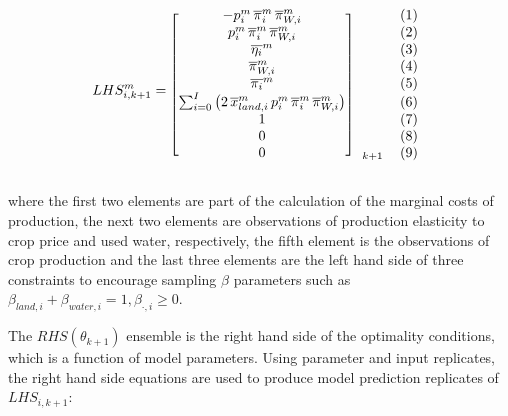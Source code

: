 \begin{equation}
LHS_{i, k+1}^m = 
\begin{blockarray}{ccc}
\begin{block}{[c]cc}\label{eq:LHS}
    -p_i^m\, \overline{\pi}_i^m \, \overline{\pi}_{W,i}^m & &(1)\\
    p_i^m \,\overline{\pi}_i^m \, \overline{\pi}_{W,i}^m & &(2)\\
    \overline{\eta_i}^m & &(3)\\
    \overline{\pi}_{W,i}^m& &(4)\\
    \overline{\pi_i}^m& &(5)\\
    \sum_{i=0}^{I} \left(2\, \overline{x}_{land,i}^m \,p_i^m \,\overline{\pi}_i^m \,\overline{\pi}_{W,i}^m \right) & &(6)\\
    1& &(7)\\
    0& &(8)\\
    0&_{k+1} &(9)\\ 
\end{block}
\end{blockarray}
\end{equation}

\noindent where the first two elements are part of the calculation of the marginal costs of production, the next two elements are observations of production elasticity to crop price and used water, respectively, the fifth element is the observations of crop production and the last three elements are the left hand side of three constraints to encourage sampling $\beta$ parameters such as $\beta_{land,i} + \beta_{water,i}=1, \beta_{\cdot,i}\geq 0$.

The $RHS(\theta_{k+1})$ ensemble is the right hand side of the optimality conditions, which is a function of model parameters. Using parameter and input replicates, the right hand side equations are used to produce model prediction replicates of $LHS_{i, k+1}$:


